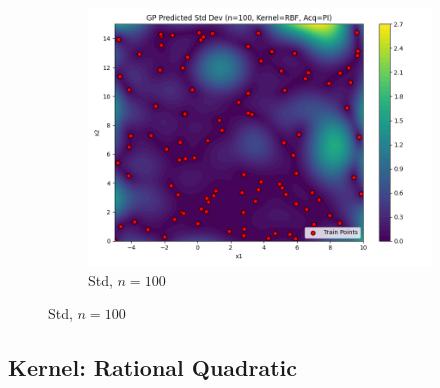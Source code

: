 \documentclass[a4paper,12pt]{article}
\begin{document}
\begin{figure}[H]
\begin{subfigure}{0.3\textwidth}
    \includegraphics[width=\linewidth]{Task-02/images/gp_std_rbf_n100_PI.png}
    \caption{Std, $n=100$}
\end{subfigure}
\end{figure}

\subsection*{Kernel: Rational Quadratic}
\end{document}
